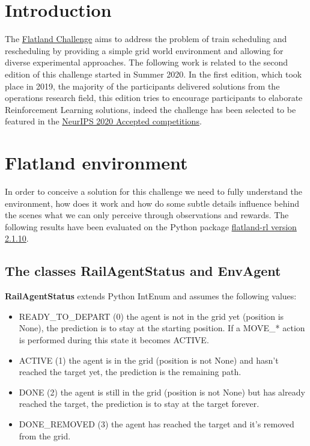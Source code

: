 \documentclass[11pt, a4paper, hidelinks]{report}
\begin{document}
\chapter*{Introduction}
The \href{https://www.aicrowd.com/challenges/neurips-2020-flatland-challenge/}{Flatland Challenge} aims to address the problem of train scheduling and rescheduling by providing a simple grid world environment and allowing for diverse experimental approaches.
The following work is related to the second edition of this challenge started in Summer 2020.
In the first edition, which took place in 2019, the majority of the participants delivered solutions from the operations research field, this edition tries to encourage participants to elaborate Reinforcement Learning solutions, indeed the challenge has been selected to be featured in the \href{https://neurips.cc/Conferences/2020/CompetitionTrack}{NeurIPS 2020 Accepted competitions}.

\chapter{Flatland environment}\label{ch:flatland-environment}

In order to conceive a solution for this challenge we need to fully understand the environment, how does it work and how do some subtle details influence behind the scenes what we can only perceive through observations and rewards.
The following results have been evaluated on the Python package \href{https://pypi.org/project/flatland-rl/}{flatland-rl version 2.1.10}.

\section*{The classes RailAgentStatus and EnvAgent}\label{sec:the-classes-railagentstatus-and-envagent}

\textbf{RailAgentStatus} extends Python IntEnum and assumes the following values:
\begin{itemize}
	\item READY\_TO\_DEPART (0) the agent is not in the grid yet (position is None), the prediction is to stay at the starting position.
If a MOVE\_* action is performed during this state it becomes ACTIVE\@.
	\item ACTIVE (1) the agent is in the grid (position is not None) and hasn't reached the target yet, the prediction is the remaining path.
	\item DONE (2) the agent is still in the grid (position is not None) but has already reached the target, the prediction is to stay at the target forever.
	\item DONE\_REMOVED (3) the agent has reached the target and it's removed from the grid.
\end{itemize}
\end{document}
